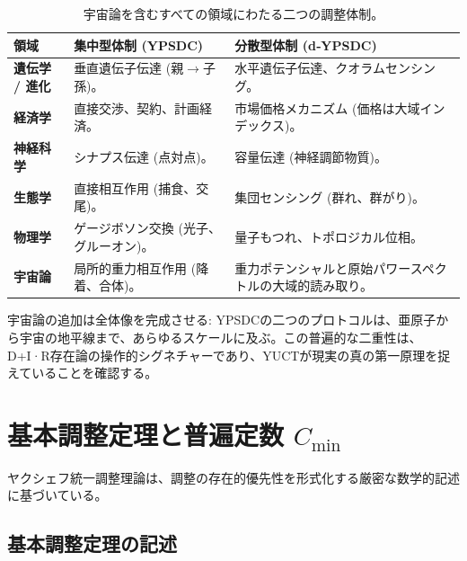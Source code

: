 \documentclass[11pt,a4paper]{article}
\begin{document}
	\begin{table}[htbp]
		\centering
		\caption{宇宙論を含むすべての領域にわたる二つの調整体制。}
		\label{tab:two-regimes-full}
	
			\begin{tabular}{p{2.5cm}p{4.5cm}p{4.5cm}}
				\toprule
				\textbf{領域} & \textbf{集中型体制 (YPSDC)} & \textbf{分散型体制 (d‑YPSDC)} \\
				\midrule
				\textbf{遺伝学 / 進化} &
				垂直遺伝子伝達 (親$\to$子孫)。 &
				水平遺伝子伝達、クオラムセンシング。 \\
				\midrule
				\textbf{経済学} &
				直接交渉、契約、計画経済。 &
				市場価格メカニズム (価格は大域インデックス)。 \\
				\midrule
				\textbf{神経科学} &
				シナプス伝達 (点対点)。 &
				容量伝達 (神経調節物質)。 \\
				\midrule
				\textbf{生態学} &
				直接相互作用 (捕食、交尾)。 &
				集団センシング (群れ、群がり)。 \\
				\midrule
				\textbf{物理学} &
				ゲージボソン交換 (光子、グルーオン)。 &
				量子もつれ、トポロジカル位相。 \\
				\midrule
				\textbf{宇宙論} &
				局所的重力相互作用 (降着、合体)。 &
				重力ポテンシャルと原始パワースペクトルの大域的読み取り。 \\
				\bottomrule
			\end{tabular}
		
	\end{table}
	
	\noindent
	宇宙論の追加は全体像を完成させる: YPSDCの二つのプロトコルは、亜原子から宇宙の地平線まで、あらゆるスケールに及ぶ。この普遍的な二重性は、D+I·R存在論の操作的シグネチャーであり、YUCTが現実の真の第一原理を捉えていることを確認する。
	
	\section{基本調整定理と普遍定数 \texorpdfstring{$C_{\min}$}{C\_min}}
	\label{sec:fundamental-theorem}
	
	ヤクシェフ統一調整理論は、調整の存在的優先性を形式化する厳密な数学的記述に基づいている。
	
	\subsection{基本調整定理の記述}
	
\end{document}
